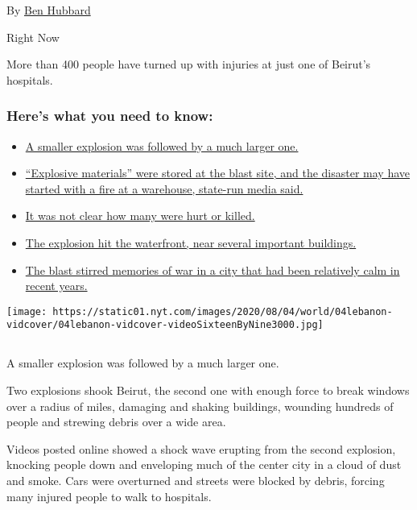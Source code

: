 By \href{https://www.nytimes.com/by/ben-hubbard}{Ben Hubbard}

Right Now

More than 400 people have turned up with injuries at just one of
Beirut's hospitals.

\hypertarget{heres-what-you-need-to-know}{%
\subsubsection{Here's what you need to
know:}\label{heres-what-you-need-to-know}}

\begin{itemize}
\tightlist
\item
  \protect\hyperlink{link-12ef1c10}{A smaller explosion was followed by
  a much larger one.}
\item
  \protect\hyperlink{link-4ec3be73}{``Explosive materials'' were stored
  at the blast site, and the disaster may have started with a fire at a
  warehouse, state-run media said.}
\item
  \protect\hyperlink{link-26e5e8b0}{It was not clear how many were hurt
  or killed.}
\item
  \protect\hyperlink{link-1202af77}{The explosion hit the waterfront,
  near several important buildings.}
\item
  \protect\hyperlink{link-3a2e264f}{The blast stirred memories of war in
  a city that had been relatively calm in recent years.}
\end{itemize}

\texttt{[image: https://static01.nyt.com/images/2020/08/04/world/04lebanon-vidcover/04lebanon-vidcover-videoSixteenByNine3000.jpg]}

\subsection{}

A smaller explosion was followed by a much larger one.

Two explosions shook Beirut, the second one with enough force to break
windows over a radius of miles, damaging and shaking buildings, wounding
hundreds of people and strewing debris over a wide area.

Videos posted online showed a shock wave erupting from the second
explosion, knocking people down and enveloping much of the center city
in a cloud of dust and smoke. Cars were overturned and streets were
blocked by debris, forcing many injured people to walk to hospitals.

